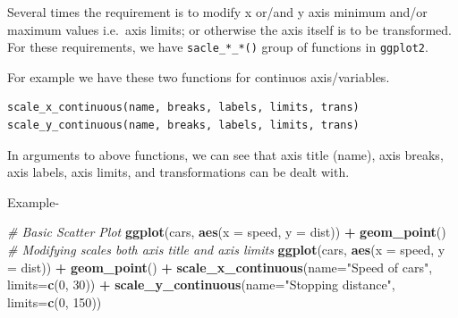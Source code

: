 \documentclass[
]{book}
\newenvironment{Shaded}{\begin{snugshade}}{\end{snugshade}}
\newcommand{\AttributeTok}[1]{\textcolor[rgb]{0.13,0.29,0.53}{#1}}
\newcommand{\CommentTok}[1]{\textcolor[rgb]{0.56,0.35,0.01}{\textit{#1}}}
\newcommand{\DecValTok}[1]{\textcolor[rgb]{0.00,0.00,0.81}{#1}}
\newcommand{\FunctionTok}[1]{\textcolor[rgb]{0.13,0.29,0.53}{\textbf{#1}}}
\newcommand{\NormalTok}[1]{#1}
\newcommand{\SpecialCharTok}[1]{\textcolor[rgb]{0.81,0.36,0.00}{\textbf{#1}}}
\newcommand{\StringTok}[1]{\textcolor[rgb]{0.31,0.60,0.02}{#1}}
\begin{document}
Several times the requirement is to modify x or/and y axis minimum and/or maximum values i.e.~axis limits; or otherwise the axis itself is to be transformed. For these requirements, we have \texttt{sacle\_*\_*()} group of functions in \texttt{ggplot2}.

For example we have these two functions for continuos axis/variables.

\begin{verbatim}
scale_x_continuous(name, breaks, labels, limits, trans)
scale_y_continuous(name, breaks, labels, limits, trans)
\end{verbatim}

In arguments to above functions, we can see that axis title (name), axis breaks, axis labels, axis limits, and transformations can be dealt with.

Example-

\begin{Shaded}
\begin{Highlighting}[]
\CommentTok{\# Basic Scatter Plot}
\FunctionTok{ggplot}\NormalTok{(cars, }\FunctionTok{aes}\NormalTok{(}\AttributeTok{x =}\NormalTok{ speed, }\AttributeTok{y =}\NormalTok{ dist)) }\SpecialCharTok{+} 
  \FunctionTok{geom\_point}\NormalTok{()}
\CommentTok{\# Modifying scales both axis title and axis limits}
\FunctionTok{ggplot}\NormalTok{(cars, }\FunctionTok{aes}\NormalTok{(}\AttributeTok{x =}\NormalTok{ speed, }\AttributeTok{y =}\NormalTok{ dist)) }\SpecialCharTok{+} 
  \FunctionTok{geom\_point}\NormalTok{() }\SpecialCharTok{+} 
  \FunctionTok{scale\_x\_continuous}\NormalTok{(}\AttributeTok{name=}\StringTok{"Speed of cars"}\NormalTok{, }\AttributeTok{limits=}\FunctionTok{c}\NormalTok{(}\DecValTok{0}\NormalTok{, }\DecValTok{30}\NormalTok{)) }\SpecialCharTok{+}
  \FunctionTok{scale\_y\_continuous}\NormalTok{(}\AttributeTok{name=}\StringTok{"Stopping distance"}\NormalTok{, }\AttributeTok{limits=}\FunctionTok{c}\NormalTok{(}\DecValTok{0}\NormalTok{, }\DecValTok{150}\NormalTok{))}
\end{Highlighting}
\end{Shaded}
\end{document}
